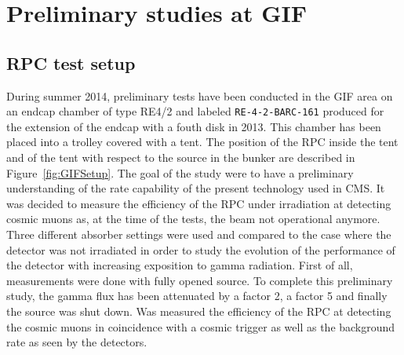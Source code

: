 \section{Preliminary studies at GIF}
\label{chapt5:sec:GIFtests}

	\subsection{RPC test setup}
	\label{chapt5:ssec:RPCSetup}
	
	During summer 2014, preliminary tests have been conducted in the GIF area on an endcap chamber of type RE4/2 and labeled \texttt{RE-4-2-BARC-161} produced for the extension of the endcap with a fouth disk in 2013. This chamber has been placed into a trolley covered with a tent. The position of the RPC inside the tent and of the tent with respect to the source in the bunker are described in Figure~\ref{fig:GIFSetup}. The goal of the study were to have a preliminary understanding of the rate capability of the present technology used in CMS. It was decided to measure the efficiency of the RPC under irradiation at detecting cosmic muons as, at the time of the tests, the beam not operational anymore. Three different absorber settings were used and compared to the case where the detector was not irradiated in order to study the evolution of the performance of the detector with increasing exposition to gamma radiation. First of all, measurements were done with fully opened source. To complete this preliminary study, the gamma flux has been attenuated by a factor 2, a factor 5 and finally the source was shut down. Was measured the efficiency of the RPC at detecting the cosmic muons in coincidence with a cosmic trigger as well as the background rate as seen by the detectors.

